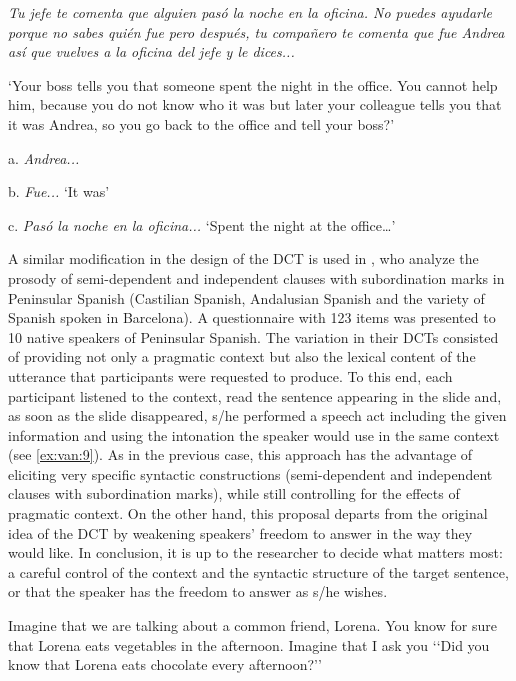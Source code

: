\documentclass[output=paper]{LSP/langsci}
\begin{document}
\ea%
    \label{ex:van:8} 

         \textit{Tu jefe te comenta que alguien pasó la noche en la oficina. No puedes ayudarle porque no sabes quién fue pero después, tu compañero te comenta que fue Andrea así que vuelves a la oficina del jefe y le dices...}

‘Your boss tells you that someone spent the night in the office. You cannot help him, because you do not know who it was but later your colleague tells you that it was Andrea, so you go back to the office and tell your boss?’

a. \textit{Andrea...}

b. \textit{Fue...} ‘It was’

c. \textit{Pasó la noche en la oficina...} ‘Spent the night at the office…’
\z

A similar modification in the design of the DCT is used in \citep{ElviraGarcia2017}, who analyze the prosody of semi-dependent and independent clauses with subordination marks in Peninsular Spanish (Castilian Spanish, Andalusian Spanish and the variety of Spanish spoken in Barcelona). A questionnaire with 123 items was presented to 10 native speakers of Peninsular Spanish. The variation in their DCTs consisted of providing not only a pragmatic context but also the lexical content of the utterance that par\-ti\-ci\-pants were requested to produce. To this end, each participant listened to the context, read the sentence appearing in the slide and, as soon as the slide disappeared, s/he performed a speech act including the given information and using the intonation the speaker would use in the same context (see \ref{ex:van:9}). As in the previous case, this approach has the advantage of eliciting very specific syntactic constructions (semi-dependent and independent clauses with subordination marks), while still controlling for the effects of pragmatic context. On the other hand, this proposal departs from the original idea of the DCT by weakening speakers’ freedom to answer in the way they would like. In conclusion, it is up to the researcher to decide what matters most: a careful control of the context and the syntactic structure of the target sentence, or that the speaker has the freedom to answer as s/he wishes. 

\ea%
    \label{ex:van:9} 

         Imagine that we are talking about a common friend, Lorena. You know for sure that Lorena eats vegetables in the afternoon. Imagine that I ask you ‘‘Did you know that Lorena eats chocolate every afternoon?’’ 
\end{document}
